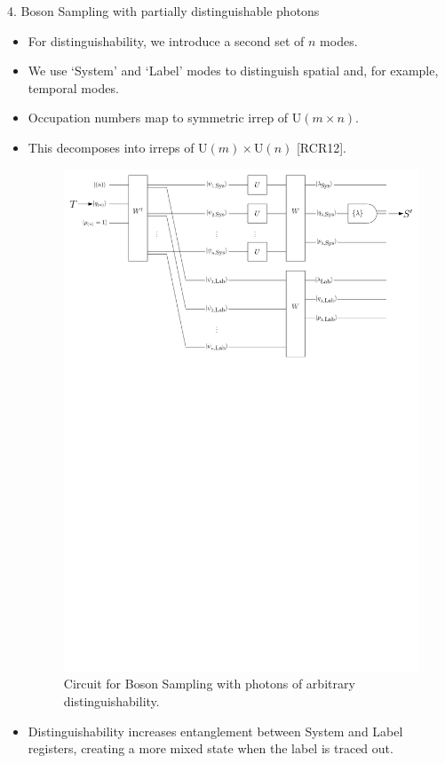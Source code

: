 \documentclass[]{templates/poster}
\begin{document}
\begin{frame}{}
\begin{columns}[t]
  \begin{column}{0.422\linewidth}
  
  \begin{block}{4. Boson Sampling with partially distinguishable photons}
  \begin{itemize}
  \item For distinguishability, we introduce a second set of $n$ modes.
  \item We use `System' and `Label' modes to distinguish spatial and, for example, temporal modes.
  \item Occupation numbers map to symmetric irrep of $\textrm{U}(m \times n)$.
  \item This decomposes into irreps of $\textrm{U}(m)\times \textrm{U}(n)$ [RCR12].
  \begin{center}
  \begin{figure}
  \includegraphics[width=0.75\linewidth]{noisy_circuit_rep2}
  \caption{\label{fig:noisy-circuit} Circuit for Boson Sampling with photons of arbitrary distinguishability.}
  \end{figure}
  \end{center}
  \item Distinguishability increases entanglement between System and Label registers, creating a more mixed state when the label is traced out.
  \end{itemize}
  \end{block}
  

\end{column}
\end{columns}
\end{frame}
\end{document}
